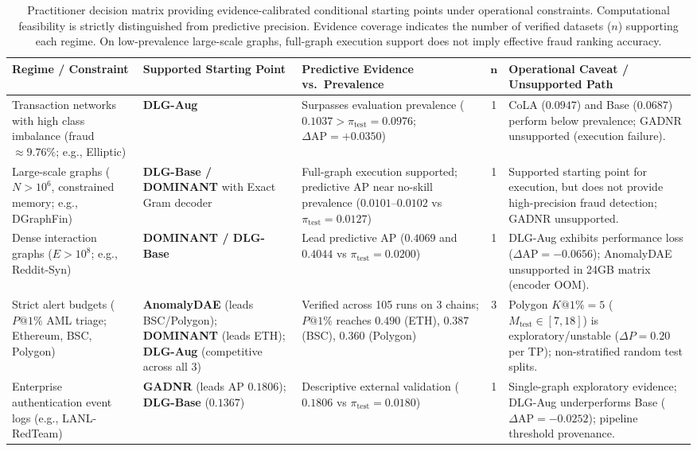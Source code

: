 \documentclass[applsci,article,submit,moreauthors,pdftex]{Definitions/mdpi}
\begin{document}
\begin{table}[htbp]
\centering\fontsize{7.2pt}{8.5pt}\selectfont\setlength{\tabcolsep}{2.5pt}
\caption{Practitioner decision matrix providing evidence-calibrated conditional starting points under operational constraints. Computational feasibility is strictly distinguished from predictive precision. Evidence coverage indicates the number of verified datasets ($n$) supporting each regime. On low-prevalence large-scale graphs, full-graph execution support does not imply effective fraud ranking accuracy.}
\label{tab:decision_matrix}
\begin{tabularx}{\textwidth}{>{\raggedright\arraybackslash}p{}>{\raggedright\arraybackslash}p{}>{\raggedright\arraybackslash}Xc>{\raggedright\arraybackslash}p{}}\toprule
\textbf{Regime / Constraint} & \textbf{Supported Starting Point} & \textbf{Predictive Evidence vs.\ Prevalence} & $\mathbf{n}$ & \textbf{Operational Caveat / Unsupported Path} \\\midrule
Transaction networks with high class imbalance (fraud $\approx 9.76\%$; e.g., Elliptic) & \textbf{DLG-Aug} & Surpasses evaluation prevalence ($0.1037 > \pi_{\mathrm{test}}=0.0976$; $\Delta\mathrm{AP}=+0.0350$) & 1 & CoLA ($0.0947$) and Base ($0.0687$) perform below prevalence; GADNR unsupported (execution failure). \\
Large-scale graphs ($N > 10^6$, constrained memory; e.g., DGraphFin) & \textbf{DLG-Base / DOMINANT} with Exact Gram decoder & Full-graph execution supported; predictive AP near no-skill prevalence ($0.0101$--$0.0102$ vs $\pi_{\mathrm{test}}=0.0127$) & 1 & Supported starting point for execution, but does not provide high-precision fraud detection; GADNR unsupported. \\
Dense interaction graphs ($E > 10^8$; e.g., Reddit-Syn) & \textbf{DOMINANT / DLG-Base} & Lead predictive AP ($0.4069$ and $0.4044$ vs $\pi_{\mathrm{test}}=0.0200$) & 1 & DLG-Aug exhibits performance loss ($\Delta\mathrm{AP}=-0.0656$); AnomalyDAE unsupported in 24GB matrix (encoder OOM). \\
Strict alert budgets ($P@1\%$ AML triage; Ethereum, BSC, Polygon) & \textbf{AnomalyDAE} (leads BSC/Polygon); \textbf{DOMINANT} (leads ETH); \textbf{DLG-Aug} (competitive across all 3) & Verified across 105 runs on 3 chains; $P@1\%$ reaches $0.490$ (ETH), $0.387$ (BSC), $0.360$ (Polygon) & 3 & Polygon $K@1\%=5$ ($M_{\mathrm{test}} \in [7, 18]$) is exploratory/unstable ($\Delta P = 0.20$ per TP); non-stratified random test splits. \\
Enterprise authentication event logs (e.g., LANL-RedTeam) & \textbf{GADNR} (leads AP $0.1806$); \textbf{DLG-Base} ($0.1367$) & Descriptive external validation ($0.1806$ vs $\pi_{\mathrm{test}}=0.0180$) & 1 & Single-graph exploratory evidence; DLG-Aug underperforms Base ($\Delta\mathrm{AP}=-0.0252$); pipeline threshold provenance. \\\bottomrule
\end{tabularx}
\end{table}
\end{document}
